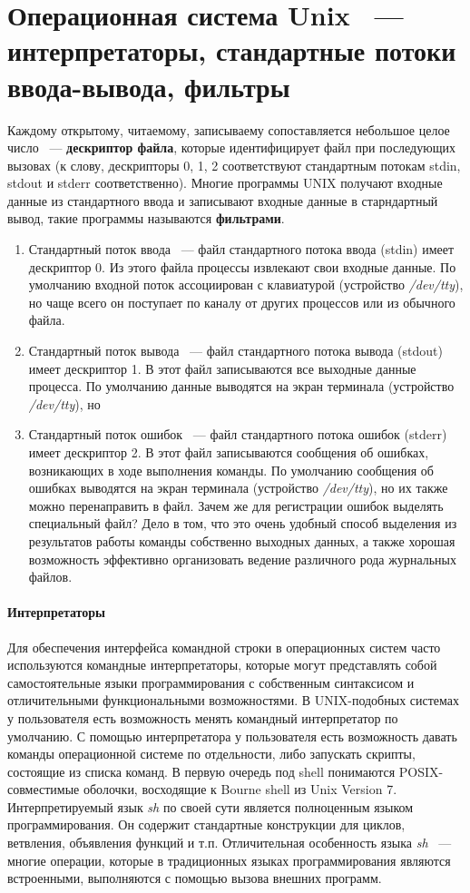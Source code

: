 \documentclass[10pt]{article}
\begin{document}
	\section{Операционная система Unix ~--- интерпретаторы, стандартные потоки ввода-вывода, фильтры}
	Каждому открытому, читаемому, записываему сопоставляется небольшое целое число ~--- \textbf{дескриптор файла}, которые идентифицирует файл при последующих вызовах (к слову, дескрипторы 0, 1, 2 соответствуют стандартным потокам stdin, stdout и stderr соответственно). Многие программы UNIX получают входные данные из стандартного ввода и записывают входные данные в старндартный вывод, такие программы называются \textbf{фильтрами}.
	\begin{enumerate}
		\item Стандартный поток ввода ~--- файл стандартного потока ввода (stdin) имеет дескриптор 0. Из этого файла процессы извлекают свои входные данные. По умолчанию входной поток ассоциирован с клавиатурой (устройство \textit{/dev/tty}), но чаще всего он поступает по каналу от других процессов или из обычного файла.
		\item Стандартный поток вывода ~--- файл стандартного потока вывода (stdout) имеет дескриптор 1. В этот файл записываются все выходные данные процесса. По умолчанию данные выводятся на экран терминала (устройство \textit{/dev/tty}), но 
		\item Стандартный поток ошибок ~--- файл стандартного потока ошибок (stderr) имеет дескриптор 2. В этот файл записываются сообщения об ошибках, возникающих в ходе выполнения команды. По умолчанию сообщения об ошибках выводятся на экран терминала (устройство \textit{/dev/tty}), но их также можно перенаправить в файл. Зачем же для регистрации ошибок выделять специальный файл?  Дело в том, что это очень удобный способ выделения из результатов работы команды собственно выходных данных, а также хорошая возможность эффективно организовать ведение различного рода журнальных файлов.
	\end{enumerate}
	\paragraph{Интерпретаторы}
	Для обеспечения интерфейса командной строки в операционных систем часто используются командные интерпретаторы, которые могут представлять собой самостоятельные языки программирования с собственным синтаксисом и отличительными функциональными возможностями.
	В UNIX-подобных системах у пользователя есть возможность менять командный интерпретатор по умолчанию.
	С помощью интерпретатора у пользователя есть возможность давать команды операционной системе по отдельности, либо запускать скрипты, состоящие из списка команд. В первую очередь под shell понимаются POSIX-совместимые оболочки, восходящие к Bourne shell из Unix Version 7.
	Интерпретируемый язык \textit{sh} по своей сути является полноценным языком программирования. Он содержит стандартные конструкции для циклов, ветвления, объявления функций и т.п. Отличительная особенность языка \textit{sh} ~--- многие операции, которые в традиционных языках программирования являются встроенными, выполняются с помощью вызова внешних программ.
\end{document}
